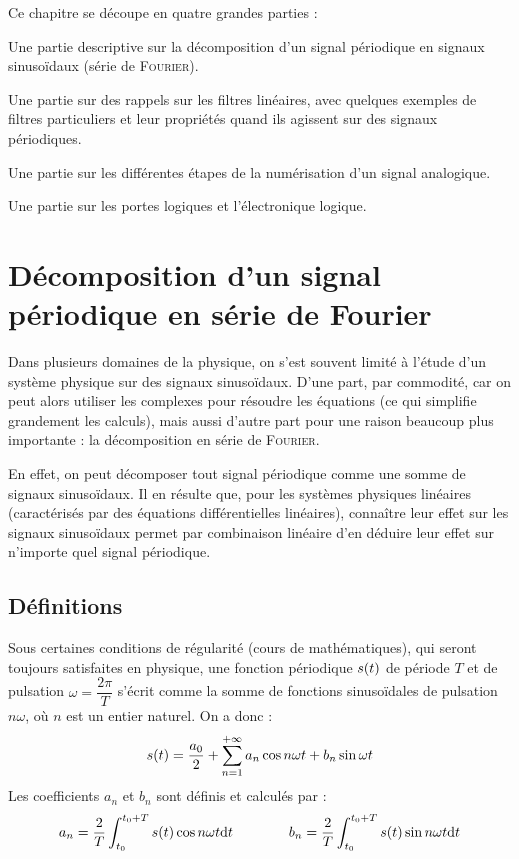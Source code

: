 \documentclass[a4paper,french,bookmarks]{book}
\newcommand{\chaptertoc}[0]{
    \setcounter{tocdepth}{2}
    \begin{tcolorbox}[
        enhanced,
        frame hidden,
        sharp corners,
        detach title,
        spread outwards     = 5pt,
        halign              = center,
        valign              = center,
        borderline west     = {3pt}{0pt}{main20!50!main2!95!gray!90},
        coltitle            = main20!50!main2!95!gray!90, 
        interior style      = {
            left color      = main1white2!65!gray!11,
            middle color    = main1white2!50!gray!10,
            right color     = main1white2!35!gray!9
        },
        arc                 = 0 cm,
        title               = SOMMAIRE,
        boxrule             = 0pt,
        fonttitle           = \bfseries\sffamily,
        overlay             = {
            \node[rotate=90, minimum width=1cm, anchor=south,yshift=-0.8cm]
            at (frame.west) {\tcbtitle};
        }
    ]
        \begin{minipage}{0.83\linewidth}
            \sffamily
            \minitoc
        \end{minipage}
    \end{tcolorbox}
}
\begin{document}
    Ce chapitre se découpe en quatre grandes parties :
    \begin{enumerate}
        \itt Une partie descriptive sur la décomposition d'un signal périodique en signaux sinusoïdaux (série de \textsc{Fourier}).
        
        \itt Une partie sur des rappels sur les filtres linéaires, avec quelques exemples de filtres particuliers et leur propriétés quand ils agissent sur des signaux périodiques.
        
        \itt Une partie sur les différentes étapes de la numérisation d'un signal analogique.
        
        \itt Une partie sur les portes logiques et l'électronique logique.
    \end{enumerate}
    
    \chaptertoc
    
    \section{Décomposition d'un signal périodique en série de Fourier}
    
    Dans plusieurs domaines de la physique, on s'est souvent limité à l'étude d'un système physique sur des signaux sinusoïdaux. D'une part, par commodité, car on peut alors utiliser les complexes pour résoudre les équations (ce qui simplifie grandement les calculs), mais aussi d'autre part pour une raison beaucoup plus importante : la décomposition en série de \textsc{Fourier}.
    
    En effet, on peut décomposer tout signal périodique comme une somme de signaux sinusoïdaux. Il en résulte que, pour les systèmes physiques linéaires (caractérisés par des équations différentielles linéaires), connaître leur effet sur les signaux sinusoïdaux permet par combinaison linéaire d'en déduire leur effet sur n'importe quel signal périodique.
    
    \subsection{Définitions}
    
    Sous certaines conditions de régularité (\cf cours de mathématiques), qui seront toujours satisfaites en physique, une fonction périodique $s\!\left(t\right)$ de période $T$ et de pulsation $\omega = \dfrac{2\pi}{T}$ s'écrit comme la somme de fonctions sinusoïdales de pulsation $n\omega$, où $n$ est un entier naturel. On a donc :
    \[ s\!\left(t\right) = \dfrac{a_0}{2} + \sum_{n=1}^{+\infty} a_n\cos{n\omega t} + b_n\sin{\omega t}\]
    Les coefficients $a_n$ et $b_n$ sont définis et calculés par :
    \[ a_n = \dfrac{2}{T}\int_{t_0}^{t_0 + T} s\!\left(t\right)\cos{n\omega t}\mathrm d t \qquad\qquad b_n = \dfrac{2}{T} \int_{t_0}^{t_0 + T} s\!\left(t\right)\sin{n\omega t}\mathrm d t \]
    
\end{document}
